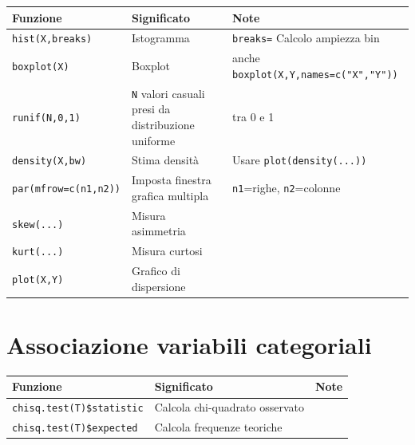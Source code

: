 \documentclass[
  a4paper,
  DIV=11,
  numbers=noendperiod]{scrreprt}
\begin{document}
\begin{longtable}[]{@{}
  >{\raggedright\arraybackslash}p{}
  >{\raggedright\arraybackslash}p{}
  >{\raggedright\arraybackslash}p{}@{}}
\toprule\noalign{}
\begin{minipage}[b]{\linewidth}\raggedright
Funzione
\end{minipage} & \begin{minipage}[b]{\linewidth}\raggedright
Significato
\end{minipage} & \begin{minipage}[b]{\linewidth}\raggedright
Note
\end{minipage} \\
\midrule\noalign{}
\endhead
\bottomrule\noalign{}
\endlastfoot
\texttt{hist(X,breaks)} & Istogramma & \texttt{breaks=} Calcolo ampiezza
bin \\
\texttt{boxplot(X)} & Boxplot & anche
\texttt{boxplot(X,Y,names=c("X","Y"))} \\
\texttt{runif(N,0,1)} & \texttt{N} valori casuali presi da distribuzione
uniforme & tra 0 e 1 \\
\texttt{density(X,bw)} & Stima densità & Usare
\texttt{plot(density(...))} \\
\texttt{par(mfrow=c(n1,n2))} & Imposta finestra grafica multipla &
\texttt{n1}=righe, \texttt{n2}=colonne \\
\texttt{skew(...)} & Misura asimmetria & \\
\texttt{kurt(...)} & Misura curtosi & \\
\texttt{plot(X,Y)} & Grafico di dispersione & \\
\end{longtable}

\section{Associazione variabili
categoriali}\label{associazione-variabili-categoriali}

\begin{longtable}[]{@{}lll@{}}
\toprule\noalign{}
Funzione & Significato & Note \\
\midrule\noalign{}
\endhead
\bottomrule\noalign{}
\endlastfoot
\texttt{chisq.test(T)\$statistic} & Calcola chi-quadrato osservato & \\
\texttt{chisq.test(T)\$expected} & Calcola frequenze teoriche & \\
\end{longtable}
\end{document}
